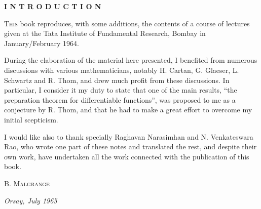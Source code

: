 \begin{center}
{\large\bf I N T R O D U C T I O N}\label{intro}
\end{center}

\medskip

\noindent
\textsc{This} book reproduces, with some additions, the contents of a course of lectures given at the Tata Institute of Fundamental Research, Bombay in January/February 1964.

\smallskip

During the elaboration of the material here presented, I benefited from numerous discussions with various mathematicians, notably H. Cartan, G. Glaeser, L. Schwartz and R. Thom, and drew much profit from these discussions. In particular, I consider it my duty to state that one of the main results, ``the preparation theorem for differentiable functions'', was proposed to me as a conjecture by R. Thom, and that he had to make a great effort to overcome my initial scepticism.

\smallskip

I would like also to thank specially Raghavan Narasimhan and N. Venkateswara Rao, who wrote one part of these notes and translated the rest, and despite their own work, have undertaken all the work connected with the publication of this book.

\bigskip
\hfill \textsc{B. Malgrange}

\noindent
{\em Orsay, July 1965}
